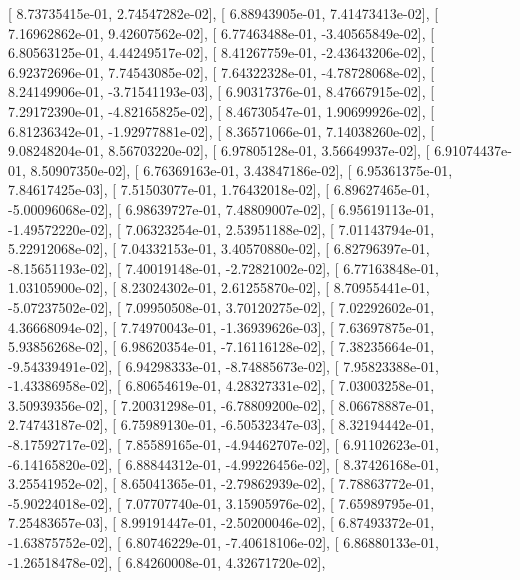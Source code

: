 \documentclass{article}
\begin{document}
       [  8.73735415e-01,   2.74547282e-02],
       [  6.88943905e-01,   7.41473413e-02],
       [  7.16962862e-01,   9.42607562e-02],
       [  6.77463488e-01,  -3.40565849e-02],
       [  6.80563125e-01,   4.44249517e-02],
       [  8.41267759e-01,  -2.43643206e-02],
       [  6.92372696e-01,   7.74543085e-02],
       [  7.64322328e-01,  -4.78728068e-02],
       [  8.24149906e-01,  -3.71541193e-03],
       [  6.90317376e-01,   8.47667915e-02],
       [  7.29172390e-01,  -4.82165825e-02],
       [  8.46730547e-01,   1.90699926e-02],
       [  6.81236342e-01,  -1.92977881e-02],
       [  8.36571066e-01,   7.14038260e-02],
       [  9.08248204e-01,   8.56703220e-02],
       [  6.97805128e-01,   3.56649937e-02],
       [  6.91074437e-01,   8.50907350e-02],
       [  6.76369163e-01,   3.43847186e-02],
       [  6.95361375e-01,   7.84617425e-03],
       [  7.51503077e-01,   1.76432018e-02],
       [  6.89627465e-01,  -5.00096068e-02],
       [  6.98639727e-01,   7.48809007e-02],
       [  6.95619113e-01,  -1.49572220e-02],
       [  7.06323254e-01,   2.53951188e-02],
       [  7.01143794e-01,   5.22912068e-02],
       [  7.04332153e-01,   3.40570880e-02],
       [  6.82796397e-01,  -8.15651193e-02],
       [  7.40019148e-01,  -2.72821002e-02],
       [  6.77163848e-01,   1.03105900e-02],
       [  8.23024302e-01,   2.61255870e-02],
       [  8.70955441e-01,  -5.07237502e-02],
       [  7.09950508e-01,   3.70120275e-02],
       [  7.02292602e-01,   4.36668094e-02],
       [  7.74970043e-01,  -1.36939626e-03],
       [  7.63697875e-01,   5.93856268e-02],
       [  6.98620354e-01,  -7.16116128e-02],
       [  7.38235664e-01,  -9.54339491e-02],
       [  6.94298333e-01,  -8.74885673e-02],
       [  7.95823388e-01,  -1.43386958e-02],
       [  6.80654619e-01,   4.28327331e-02],
       [  7.03003258e-01,   3.50939356e-02],
       [  7.20031298e-01,  -6.78809200e-02],
       [  8.06678887e-01,   2.74743187e-02],
       [  6.75989130e-01,  -6.50532347e-03],
       [  8.32194442e-01,  -8.17592717e-02],
       [  7.85589165e-01,  -4.94462707e-02],
       [  6.91102623e-01,  -6.14165820e-02],
       [  6.88844312e-01,  -4.99226456e-02],
       [  8.37426168e-01,   3.25541952e-02],
       [  8.65041365e-01,  -2.79862939e-02],
       [  7.78863772e-01,  -5.90224018e-02],
       [  7.07707740e-01,   3.15905976e-02],
       [  7.65989795e-01,   7.25483657e-03],
       [  8.99191447e-01,  -2.50200046e-02],
       [  6.87493372e-01,  -1.63875752e-02],
       [  6.80746229e-01,  -7.40618106e-02],
       [  6.86880133e-01,  -1.26518478e-02],
       [  6.84260008e-01,   4.32671720e-02],
\end{document}
